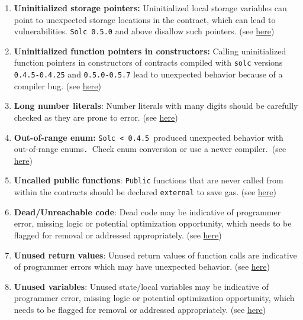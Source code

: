 \begin{enumerate}
\item\textbf{Uninitialized storage pointers: }Uninitialized local storage variables can point to unexpected storage locations in the contract, which can lead to vulnerabilities. \verb|Solc 0.5.0| and above disallow such pointers. (see \href{https://swcregistry.io/docs/SWC-109}{here})

\item\textbf{Uninitialized function pointers in constructors: }Calling uninitialized function pointers in constructors of contracts compiled with \verb|solc| versions \verb|0.4.5-0.4.25| and \verb|0.5.0-0.5.7| lead to unexpected behavior because of a compiler bug. (see \href{https://github.com/crytic/slither/wiki/Detector-Documentation\#uninitialized-function-pointers-in-constructors}{here})

\item\textbf{Long number literals}: Number literals with many digits should be carefully checked as they are prone to error. (see \href{https://github.com/crytic/slither/wiki/Detector-Documentation\#too-many-digits}{here})

\item\textbf{Out-of-range enum: }\verb|Solc < 0.4.5 |produced unexpected behavior with out-of-range enums\verb|. |Check enum conversion or use a newer compiler.\verb| |(see \href{https://github.com/crytic/slither/wiki/Detector-Documentation\#dangerous-enum-conversion}{here})

\item\textbf{Uncalled public functions}: \verb|Public| functions that are never called from within the contracts should be declared \verb|external| to save gas. (see \href{https://github.com/crytic/slither/wiki/Detector-Documentation\#public-function-that-could-be-declared-external}{here})

\item\textbf{Dead/Unreachable code}: Dead code may be indicative of programmer error, missing logic or potential optimization opportunity, which needs to be flagged for removal or addressed appropriately. (see \href{https://en.wikipedia.org/wiki/Dead\_code}{here})

\item\textbf{Unused return values}: Unused return values of function calls are indicative of programmer errors which may have unexpected behavior. (see \href{https://github.com/crytic/slither/wiki/Detector-Documentation\#unused-return}{here})

\item\textbf{Unused variables}: Unused state/local variables may be indicative of programmer error, missing logic or potential optimization opportunity, which needs to be flagged for removal or addressed appropriately. (see \href{https://swcregistry.io/docs/SWC-131}{here})


\end{enumerate}
